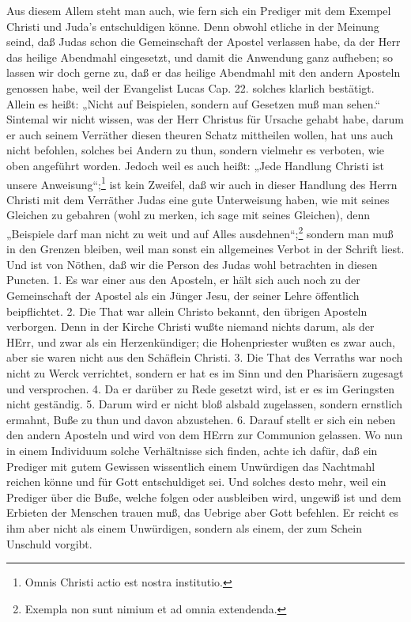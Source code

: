 Aus diesem Allem steht man auch, wie fern sich ein Prediger mit dem Exempel Christi und Juda’s entschuldigen könne. Denn obwohl etliche in der Meinung seind, daß Judas schon die Gemeinschaft der Apostel verlassen habe, da der Herr das heilige Abendmahl eingesetzt, und damit die Anwendung ganz aufheben; so lassen wir doch gerne zu, daß er das heilige Abendmahl mit den andern Aposteln genossen habe, weil der Evangelist Lucas Cap. 22. solches klarlich bestätigt. Allein es heißt: „Nicht auf Beispielen, sondern auf Gesetzen muß man sehen.“ Sintemal wir nicht wissen, was der Herr Christus für Ursache gehabt habe, darum er auch seinem Verräther diesen theuren Schatz mittheilen wollen, hat uns auch nicht befohlen, solches bei Andern zu thun, sondern vielmehr es verboten, wie oben angeführt worden. Jedoch weil es auch heißt: „Jede Handlung Christi ist unsere Anweisung“;\footnote{Omnis Christi actio est nostra institutio.} ist kein Zweifel, daß wir auch in dieser Handlung des Herrn Christi mit dem Verräther Judas eine gute Unterweisung haben, wie mit seines Gleichen zu gebahren (wohl zu merken, ich sage mit seines Gleichen), denn „Beispiele darf man nicht zu weit und auf Alles ausdehnen“;\footnote{Exempla non sunt nimium et ad omnia extendenda.} sondern man muß in den Grenzen bleiben, weil man sonst ein allgemeines Verbot in der Schrift liest. Und ist von Nöthen, daß wir die Person des Judas wohl betrachten in diesen Puncten. 1. Es war einer aus den Aposteln, er hält sich auch noch zu der Gemeinschaft der Apostel als ein Jünger Jesu, der seiner Lehre öffentlich beipflichtet. 2. Die That war allein Christo bekannt, den übrigen Aposteln verborgen. Denn in der Kirche Christi wußte niemand nichts darum, als
der HErr, und zwar als ein Herzenkündiger; die Hohenpriester wußten es zwar auch, aber sie waren nicht aus den Schäflein Christi. 3. Die That des Verraths war noch nicht zu Werck verrichtet, sondern er hat es im Sinn und den Pharisäern zugesagt und versprochen. 4. Da er darüber zu Rede gesetzt wird, ist er es im Geringsten nicht geständig. 5. Darum wird er nicht bloß alsbald zugelassen, sondern ernstlich ermahnt, Buße zu thun und davon abzustehen. 6. Darauf stellt er sich ein neben den andern Aposteln und wird von dem HErrn zur Communion gelassen. Wo nun in einem Individuum solche Verhältnisse sich finden, achte ich dafür, daß ein Prediger mit gutem Gewissen wissentlich einem Unwürdigen das Nachtmahl reichen könne und für Gott entschuldiget sei. Und solches desto mehr, weil ein Prediger über die Buße, welche folgen oder ausbleiben wird, ungewiß ist und dem Erbieten der Menschen trauen muß, das Uebrige aber Gott befehlen. Er reicht es ihm aber nicht als einem Unwürdigen, sondern als einem, der zum Schein Unschuld vorgibt.

